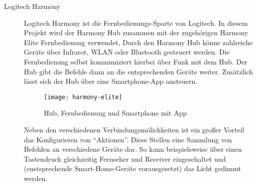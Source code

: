 \begin{description}
    \item[Logitech Harmony \cite{HarmonyH15:online}]
        Logitech Harmony ist die Fernbedienungs-Sparte von Logitech.
        In diesem Projekt wird der Harmony Hub zusammen mit der zugehörigen Harmony Elite Fernbedienung verwendet,
        Durch den Harmony Hub könne zahlreiche Geräte über Infrarot, WLAN oder Bluetooth gesteuert werden.
        Die Fernbedienung selbst kommuniziert hierbei über Funk \cite{HowToPoi90:online} mit dem Hub.
        Der Hub gibt die Befehle dann an die entsprechenden Geräte weiter.
        Zusätzlich lässt sich der Hub über eine Smartphone-App ansteuern.

        \begin{figure}[h!]
            \centering
            \texttt{[image: harmony-elite]}
            \caption{Hub, Fernbedienung und Smartphone mit App}\label{fig:harmony}
        \end{figure}

        Neben den verschiedenen Verbindungsmölichkeiten ist ein großer Vorteil das Konfigurieren von \enquote{Aktionen}.
        Diese Stellen eine Sammlung von Befehlen an verschiedene Geräte dar.
        So kann beispielsweise über einen Tastendruck gleichzeitig Fernseher und Receiver eingeschaltet
        und (enstsprechende Smart-Home-Geräte vorausgesetzt) das Licht gedimmt werden.
\end{description}
